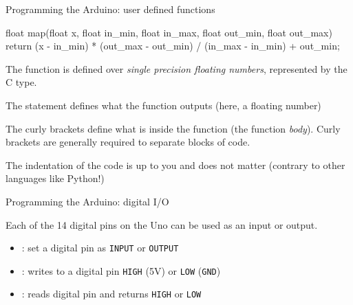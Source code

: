 \documentclass[compress]{beamer}
\begin{document}
\begin{frame}[fragile]{Programming the Arduino: user defined functions}

    \begin{cppcode}
float map(float x,
          float in_min, float in_max, 
          float out_min, float out_max)
{
    return (x - in_min) * (out_max - out_min) / (in_max - in_min) + out_min;
}
    \end{cppcode}

     {
    The function is defined over \emph{single precision floating numbers},
    represented by the  C type.

    The  statement defines what the function outputs (here, a
    floating number)

    The curly brackets \cpp{{}} define what is inside the function (the
    function \emph{body}). Curly brackets are generally required to separate
    blocks of code.

    The indentation of the code is up to you and does not matter (contrary to
    other languages like Python!)

    }
\end{frame}

\begin{frame}{Programming the Arduino: digital I/O}

    Each of the 14 digital pins on the Uno can be used as an input or output.

    \begin{itemize}
        \item {}: set a digital pin as \texttt{INPUT}
            or \texttt{OUTPUT}
        \item {}: writes to a digital pin
            \texttt{HIGH} (5V) or \texttt{LOW} (\texttt{GND})
        \item {}: reads digital pin and returns
            \texttt{HIGH} or \texttt{LOW}
    \end{itemize}

\end{frame}
\end{document}
